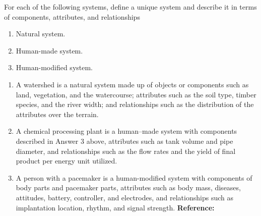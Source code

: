 \begin{exercises}
    \begin{exercise} 
    \label{sea-1-9}
        For each of the following systems, define a unique system and describe it in terms of components, attributes, and relationships
        \begin{enumerate}[label=\alph*)]
            \item Natural system.
            \item Human-made system.
            \item Human-modified system.
        \end{enumerate}
    \end{exercise}
    \begin{solution}
        \begin{enumerate}[label=\alph*)]
            \item A watershed is a natural system made up of objects or components such as land, vegetation, and the watercourse; attributes such as the soil type, timber species, and the river width; and relationships such as the distribution of the attributes over the terrain. 
            \item A chemical processing plant is a human–made system with components described in Answer 3 above, attributes such as tank volume and pipe diameter, and relationships such as the flow rates and the yield of final product per energy unit utilized.
            \item A person with a pacemaker is a human-modified system with components of body parts and pacemaker parts, attributes such as body mass, diseases, attitudes, battery, controller, and electrodes, and relationships such as implantation location, rhythm, and signal strength. \textbf{Reference:}
        \end{enumerate}
    \end{solution}
    

\end{exercises}

